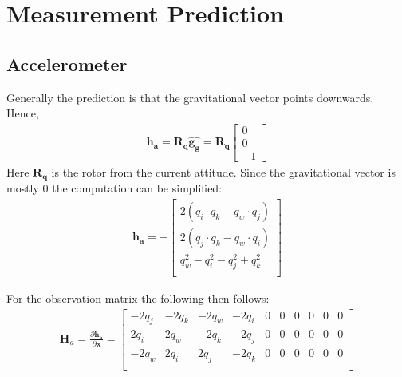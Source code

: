 \documentclass[10pt,a4paper]{article}
\newcommand{\M}[1]{\mathbf{#1}}
\newcommand{\V}[1]{\mathbf{#1}}
\newcommand{\Vh}[1]{\mathbf{\hat{#1}}}
\begin{document}
\section{Measurement Prediction}

\subsection{Accelerometer}
Generally the prediction is that the gravitational vector points downwards.
Hence,
\begin{align}
  \V {h_a} =  \M {R_q} \Vh{g_g} = \M {R_q}
  \begin{bmatrix}
    0 \\ 0 \\ -1
  \end{bmatrix}
\end{align}
Here $\M {R_q}$ is the rotor from the current attitude.
Since the gravitational vector is mostly 0 the computation can be simplified:
\begin{align}
  \V {h_a} = - \begin{bmatrix}
    2 (q_i \cdot q_k + q_w \cdot q_j) \\
    2 (q_j \cdot q_k - q_w \cdot q_i) \\
    q_w^2 - q_i^2 - q_j^2 + q_k^2 \\
  \end{bmatrix}
\end{align}

For the observation matrix the following then follows:
\begin{align}
 \M H_a =  \frac { \partial \V {h_a}}  {\partial \V x}  =
  \begin{bmatrix}
    - 2 q_j & - 2 q_k & - 2 q_w & - 2 q_i & 0 & 0 & 0 & 0 & 0 & 0 \\
    2 q_i & 2 q_w & - 2 q_k & - 2 q_j & 0 & 0 & 0 & 0 & 0 & 0 \\
    - 2 q_w & 2 q_i & 2 q_j & - 2 q_k & 0 & 0 & 0 & 0 & 0 & 0 \\
  \end{bmatrix}
\end{align}
\end{document}
